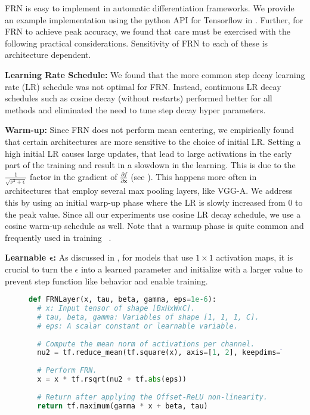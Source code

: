 \documentclass[10pt,twocolumn,letterpaper]{article}
\newcommand{\papername}{FRN}
\begin{document}
\papername{} is easy to implement in automatic differentiation frameworks. We provide an example implementation using the python API for Tensorflow in . Further, for FRN to achieve peak accuracy, we found that care must be exercised with the following practical considerations. Sensitivity of FRN to each of these is architecture dependent.

\medskip
\noindent
\textbf{Learning Rate Schedule:} We found that the more common step decay learning rate (LR) schedule was not optimal for FRN. Instead, continuous LR decay schedules such as cosine decay (without restarts) performed better for all methods and eliminated the need to tune step decay hyper parameters. 

\medskip
\noindent
\textbf{Warm-up:}
Since \papername{} does not perform mean centering, we empirically found that certain architectures are more sensitive to the choice of initial LR. Setting a high initial LR causes large updates, that lead to large activations in the early part of the training and result in a slowdown in the learning. This is due to the $\frac{1}{\sqrt{\nu^2 + \epsilon}}$ factor in the gradient of $\frac{\partial f}{\partial \bm{x}}$ (see ). This happens more often in architectures that employ several max pooling layers, like VGG-A. We address this by using an initial warp-up phase where the LR is slowly increased from 0 to the peak value. Since all our experiments use cosine LR decay schedule, we use a cosine warm-up schedule as well. Note that a warmup phase is quite common and  frequently used in training ~\cite{resnets, resnetsv2,Imagenet2017}.

\medskip
\noindent
\textbf{Learnable $\bm{\epsilon}$:}
As discussed in , for models that use $1{\times}1$ activation maps, it is crucial to turn the $\epsilon$ into a learned parameter and initialize with a larger value to prevent step function like behavior and enable training.

\begin{figure}[t]
\vspace{-1mm}
\begin{lstlisting}[language=Python,caption=Tensorflow implementation of \papername{} layer,label=lst:implementation]
def FRNLayer(x, tau, beta, gamma, eps=1e-6):
  # x: Input tensor of shape [BxHxWxC].
  # tau, beta, gamma: Variables of shape [1, 1, 1, C].
  # eps: A scalar constant or learnable variable.
  
  # Compute the mean norm of activations per channel.
  nu2 = tf.reduce_mean(tf.square(x), axis=[1, 2], keepdims=True)
  
  # Perform FRN.
  x = x * tf.rsqrt(nu2 + tf.abs(eps))
  
  # Return after applying the Offset-ReLU non-linearity.
  return tf.maximum(gamma * x + beta, tau)
\end{lstlisting}
\vspace{-0.5cm}
\end{figure}
\end{document}
